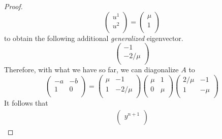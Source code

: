 \documentclass[../psets.tex]{subfiles}
\begin{document}
\begin{enumerate}
\begin{enumerate}
\begin{proof}
\begin{equation*}
\begin{pmatrix}
                    u^1\\
                    u^2\\
                \end{pmatrix}
                =
                \begin{pmatrix}
                    \mu\\
                    1\\
                \end{pmatrix}
            \end{equation*}
            to obtain the following additional \emph{generalized} eigenvector.
            \begin{equation*}
                \begin{pmatrix}
                    -1\\
                    -2/\mu\\
                \end{pmatrix}
            \end{equation*}
            Therefore, with what we have so far, we can diagonalize $A$ to
            \begin{equation*}
                \begin{pmatrix}
                    -a & -b\\
                    1 & 0\\
                \end{pmatrix}
                =
                \begin{pmatrix}
                    \mu & -1\\
                    1 & -2/\mu\\
                \end{pmatrix}
                \begin{pmatrix}
                    \mu & 1\\
                    0 & \mu\\
                \end{pmatrix}
                \begin{pmatrix}
                    2/\mu & -1\\
                    1 & -\mu\\
                \end{pmatrix}
            \end{equation*}
            It follows that
            \begin{align*}
                \begin{pmatrix}
                    y^{n+1}\\

\end{pmatrix}
\end{align*}
\end{proof}
\end{enumerate}
\end{enumerate}
\end{document}
